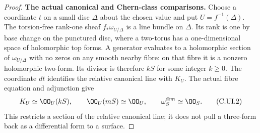 \begin{proof}
\leavevmode\par\medskip\noindent\textbf{The actual canonical and Chern-class comparisons.}\quad
Choose a coordinate $t$ on a small disc $\Delta$ about the
chosen value and put $U=f^{-1}(\Delta)$. The torsion-free
rank-one sheaf $f_*\omega_{U/\Delta}$ is a line bundle on
$\Delta$. Its rank is one by base change on the punctured
disc, where a two-torus has a one-dimensional space of
holomorphic top forms. A generator evaluates to a
holomorphic section of $\omega_{U/\Delta}$ with no zeros
on any smooth nearby fibre: on that fibre it is a nonzero
holomorphic two-form. Its divisor is therefore $kS$ for
some integer $k\ge0$. The coordinate $dt$ identifies the
relative canonical line with $K_U$. The actual fibre
equation and adjunction give
\[
 K_U\simeq\OO_U(kS),\qquad
 \OO_U(mS)\simeq\OO_U,\qquad
 \omega_S^{\otimes m}\simeq\OO_S.
 \tag{C.UI.2}\label{cdp:eq:C.UI.2}
\]
This restricts a section of the relative canonical line;
it does not pull a three-form back as a differential form
to a surface.


\end{proof}
